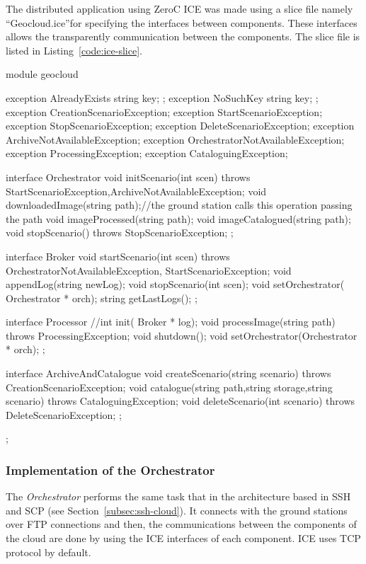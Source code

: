 The distributed application using ZeroC ICE was made using a slice file namely
``Geocloud.ice''for
specifying the  interfaces between components. These interfaces allows the transparently
communication between the components. The slice file is listed in Listing~\ref{code:ice-slice}.


\begin{listing}[
  float=h!,
  caption  = {Slice of the ICE application.},
  label    = code:ice-slice,
style=customc]

module geocloud {
    exception AlreadyExists { string key; };
    exception NoSuchKey { string key; };
    exception CreationScenarioException{};
    exception StartScenarioException{};
    exception StopScenarioException{};
    exception DeleteScenarioException{};
    exception ArchiveNotAvailableException{};
    exception OrchestratorNotAvailableException{};
    exception ProcessingException{};
    exception CataloguingException{};

    interface Orchestrator{
    	void initScenario(int scen) throws StartScenarioException,ArchiveNotAvailableException;
	void downloadedImage(string path);//the ground station calls this operation passing the path
	void imageProcessed(string path);
	void imageCatalogued(string path);
	void stopScenario() throws StopScenarioException;
    };

    interface Broker{
	void startScenario(int scen) throws OrchestratorNotAvailableException, StartScenarioException;
	void appendLog(string newLog);
	void stopScenario(int scen);
	void setOrchestrator( Orchestrator * orch);
	string getLastLogs();
    };


 interface Processor{
	//int init( Broker * log);
       	void processImage(string path) throws ProcessingException;
	void shutdown();
	void setOrchestrator(Orchestrator * orch);
    };



    interface ArchiveAndCatalogue{
	void createScenario(string scenario) throws CreationScenarioException;
	void catalogue(string path,string storage,string scenario) throws CataloguingException;
	void deleteScenario(int scenario) throws DeleteScenarioException;
    };
};
\end{listing}

\subsubsection{Implementation of the Orchestrator}

The \emph{Orchestrator} performs the same task that in the architecture based in
\ac{SSH} and \ac{SCP} (see Section~\ref{subsec:ssh-cloud}). It connects with the ground stations over \ac{FTP} connections and
then, the communications between the components of the cloud are done by using the
ICE interfaces of each component. ICE uses \ac{TCP} protocol by default.

